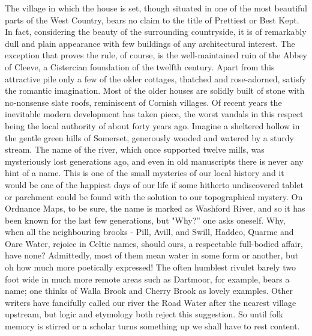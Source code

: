 The village in which the house is set, though situated in one of the most beautiful parts of the West Country, bears no claim to the title of Prettiest or Best Kept. In fact, considering the beauty of the surrounding countryside, it is of remarkably dull and plain appearance with few buildings of any architectural interest. The exception that proves the rule, of course, is the well-maintained ruin of the Abbey of Cleeve, a Cistercian foundation of the twelfth century. Apart from this attractive pile only a few of the older cottages, thatched and rose-adorned, satisfy the romantic imagination. Most of the older houses are solidly built of stone with no-nonsense slate roofs, reminiscent of Cornish villages. Of recent years the inevitable modern development has taken piece, the worst vandals in this respect being the local authority of about forty years ago. Imagine a sheltered hollow in the gentle green hills of Somerset, generously wooded and watered by a sturdy stream. The name of the river, which once supported twelve mills, was mysteriously lost generations ago, and even in old manuscripts there is never any hint of a name. This is one of the small mysteries of our local history and it would be one of the happiest days of our life if some hitherto undiscovered tablet or parchment could be found with the solution to our topographical mystery. On Ordnance Maps, to be sure, the name is marked as Washford River, and so it has been known for the last few generations, but "Why?”  one asks oneself. Why, when all the neighbouring brooks - Pill, Avill, and Swill, Haddeo, Quarme and Oare Water, rejoice in Celtic names, should ours, a respectable full-bodied affair, have none? Admittedly, most of them mean water in some form or another, but oh how much more poetically expressed! The often humblest rivulet barely two foot wide in much more remote areas such as Dartmoor, for example, bears a name; one thinks of Walla Brook and Cherry Brook as lovely examples. Other writers have fancifully called our river the Road Water after the nearest village upstream, but logic and etymology both reject this suggestion. So until folk memory is stirred or a scholar turns something up we shall have to rest content.

